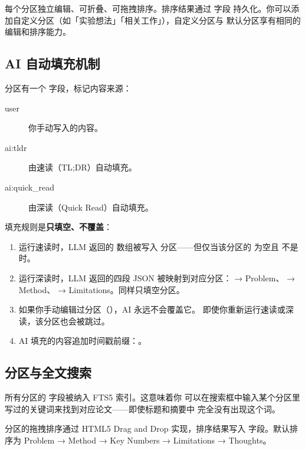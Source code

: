 每个分区独立编辑、可折叠、可拖拽排序。排序结果通过  字段
持久化。你可以添加自定义分区（如「实验想法」「相关工作」），自定义分区与
默认分区享有相同的编辑和排序能力。

\subsection{AI 自动填充机制}

分区有一个  字段，标记内容来源：

\begin{description}
  \item[user] 你手动写入的内容。
  \item[ai:tldr] 由速读（TL;DR）自动填充。
  \item[ai:quick\_read] 由深读（Quick Read）自动填充。
\end{description}

填充规则是\textbf{只填空、不覆盖}：

\begin{enumerate}
  \item 运行速读时，LLM 返回的  数组被写入 
    分区——但仅当该分区的  为空且  不是  时。
  \item 运行深读时，LLM 返回的四段 JSON 被映射到对应分区：
     → Problem、 → Method、 →
    Limitations。同样只填空分区。
  \item 如果你手动编辑过分区（），AI 永远不会覆盖它。
    即使你重新运行速读或深读，该分区也会被跳过。
  \item AI 填充的内容追加时间戳前缀：。
\end{enumerate}

\subsection{分区与全文搜索}

所有分区的  字段被纳入  FTS5 索引。这意味着你
可以在搜索框中输入某个分区里写过的关键词来找到对应论文——即使标题和摘要中
完全没有出现这个词。

\begin{tipbox}
分区的拖拽排序通过 HTML5 Drag and Drop 实现，排序结果写入 
字段。默认排序为 Problem → Method → Key Numbers → Limitations → Thoughts。
\end{tipbox}

